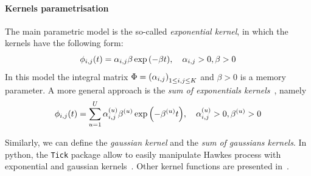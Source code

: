 \paragraph{Kernels parametrisation}
The main parametric model is the so-called \textit{exponential kernel}, in which the kernels have the following form:
\begin{equation}
    \phi_{i,j}(t) = \alpha_{i,j} \beta \exp{\left( -\beta t \right)}, \quad \alpha_{i,j} > 0, \beta > 0
\end{equation}
In this model the integral matrix $\Phi = \left( \alpha_{i,j} \right)_{1\leq i,j\leq K}$ and $\beta > 0$ is a memory parameter.
A more general approach is the \textit{sum of exponentials kernels}~\citep{lemonnier2014nonparametric}, namely
\begin{equation}
    \phi_{i,j}(t) = \sum_{u=1}^U \alpha_{i,j}^{(u)} \beta^{(u)} \exp{\left( -\beta^{(u)} t \right)}, \quad \alpha_{i,j}^{(u)} > 0, \beta^{(u)} > 0
\end{equation}

Similarly, we can define the \textit{gaussian kernel} and the \textit{sum of gaussians kernels}.
In python, the \texttt{Tick} package allow to easily manipulate Hawkes process with exponential and gaussian kernels~\citep{bompaire2019machine, bacry2017tick}.
Other kernel functions are presented in~\citep{mehrdad2014hawkes}.
